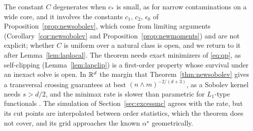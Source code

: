The constant $C$ degenerates when $c_\ast$ is small, as for narrow contaminations on a wide core, and it involves the
constants $c_1$, $c_2$, $\epsilon_0$ of Proposition~\ref{prop:newsobolev}, which come from limiting arguments
(Corollary~\ref{cor:newsobolev} and Proposition~\ref{prop:newmoments}) and are not explicit; whether $C$ is uniform over
a natural class is open, and we return to it after Lemma~\ref{lem:laplocal}. The theorem needs exact minimizers of
\eqref{eq:qp}, as self-clipping (Lemma~\ref{lem:lapclip}) is a first-order property whose survival under an inexact
solve is open. In $\mathbb{R}^d$ the margin that Theorem~\ref{thm:newsobolev} gives a transversal crossing guarantees at best
$(n\wedge m)^{-2/(d+3)}$, as a Sobolev kernel needs $s>d/2$, and the minimax rate is slower than parametric for
$L_1$-type functionals \citep{lepski1999estimation,cai2011testing,han2020estimation}. The simulation of
Section~\ref{sec:excessmc} agrees with the rate, but its cut points are interpolated between order statistics, which
the theorem does not cover, and its grid approaches the known $\alpha^\star$ geometrically.

